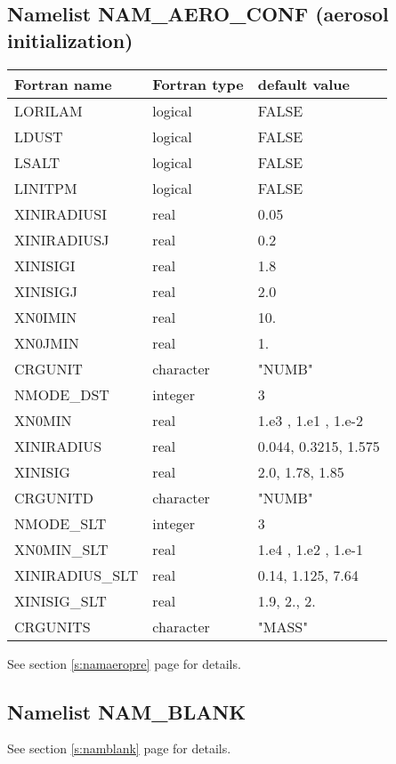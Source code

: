 \subsection{Namelist NAM\_AERO\_CONF (aerosol initialization)}
\begin{center}
\begin{tabular} {|l|l|l|}
\hline
Fortran name & Fortran type & default value\\
\hline
\hline
LORILAM      & logical       & FALSE    \\
LDUST        & logical       & FALSE    \\
LSALT        & logical       & FALSE    \\
LINITPM      & logical       & FALSE    \\
XINIRADIUSI  & real          & 0.05     \\
XINIRADIUSJ  & real          & 0.2      \\
XINISIGI     & real          & 1.8      \\
XINISIGJ     & real          & 2.0      \\
XN0IMIN      & real          & 10.      \\
XN0JMIN      & real          & 1.       \\
CRGUNIT      & character     & "NUMB"   \\
NMODE\_DST   & integer       & 3       \\
XN0MIN       & real          & 1.e3 , 1.e1 , 1.e-2 \\
XINIRADIUS   & real          & 0.044, 0.3215, 1.575 \\
XINISIG      & real          & 2.0, 1.78, 1.85 \\
CRGUNITD     & character     & "NUMB"   \\
NMODE\_SLT   & integer       & 3       \\
XN0MIN\_SLT  & real          & 1.e4 , 1.e2 , 1.e-1 \\
XINIRADIUS\_SLT & real       & 0.14, 1.125,  7.64\\
XINISIG\_SLT    & real       & 1.9, 2., 2. \\
CRGUNITS     & character     & "MASS"   \\
\hline
\end{tabular}
\end{center}

See section \ref{s:namaeropre} page \pageref{s:namaeropre} for details.
			  
			  
\subsection{Namelist NAM\_BLANK}
See section \ref{s:namblank} page \pageref{s:namblank} for details.

